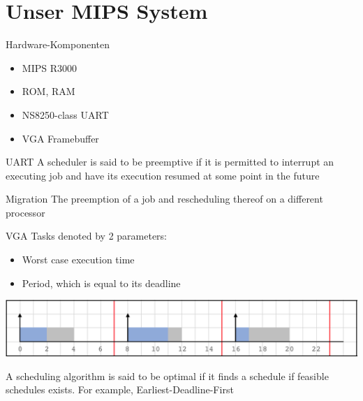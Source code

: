 \section{Unser MIPS System}

\begin{frame}{Hardware-Komponenten}

\begin{itemize}
\item MIPS R3000
\item ROM, RAM
\item NS8250-class UART
\item VGA Framebuffer
\end{itemize}


\begin{block}{UART}
A scheduler is said to be preemptive if it is permitted to interrupt an executing job and have its execution resumed at some point in the future
\end{block}
\begin{block}{Migration}
The preemption of a job and rescheduling thereof on a different processor
\end{block}

\end{frame}




\begin{frame}{VGA}
Tasks denoted by 2 parameters:
\begin{itemize}
\item Worst case execution time
\item Period, which is equal to its deadline
\end{itemize}
\begin{center}
\includegraphics[scale=0.36]{gantt-chart.png}
\end{center}

A scheduling algorithm is said to be optimal if it finds a schedule if feasible schedules exists. For example, Earliest-Deadline-First
\end{frame}

